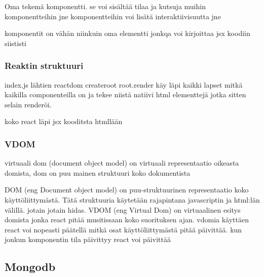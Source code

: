 \documentclass[11pt,a4paper,titlepage,oneside]{article}
\begin{document}

Oma tekemä komponentti. se voi sisältää tilaa ja kutsuja muihin komponentteihin jne
komponentteihin voi lisätä interaktiivisuutta jne



komponentit on vähän niinkuin oma elementti jonkqa voi kirjoittaa jsx koodiin siististi

\medskip

\subsubsection{Reaktin struktuuri}
index.js lähtien
reactdom createroot
root.render
käy läpi kaikki lapset mitkä kaikilla componenteilla on ja tekee niistä natiivi html elementtejä jotka sitten selain renderöi. 

koko react läpi jsx kooditsta htmllään
\medskip



\subsubsection{VDOM}



virtuaali dom (document object model) on virtuaali representaatio oikeasta domista, 
dom on puu mainen struktuuri koko dokumentista



DOM (eng Document object model) on puu-struktuurinen representaatio koko käyttöliittymästä.
Tätä struktuuria käytetään rajapintana javascriptin ja html:län välillä. jotain jotain hidas.
%
VDOM (eng Virtual Dom) on virtuaalinen esitys domista jonka react pitää musitissaan koko suorituksen ajan.
vdomia käyttäen react voi nopeasti päätellä mitkä osat käyttöliittymästä pitää päivittää.
kun jonkun komponentin tila päivittyy react voi päivittää 






\newpage
\subsection{Mongodb}
\end{document}
